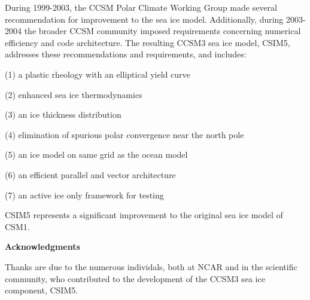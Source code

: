 \vfill
\eject
{}

During 1999-2003, the CCSM Polar Climate Working Group made several
recommendation for improvement to the sea ice model. Additionally,
during 2003-2004 the broader CCSM community imposed requirements 
concerning numerical efficiency and code architecture. The resulting 
CCSM3 sea ice model, CSIM5, addresses these recommendations and
requirements, and includes:

\parskip 10pt
\parindent 15pt

(1) a plastic rheology with an elliptical yield curve

(2) enhanced sea ice thermodynamics 

(3) an ice thickness distribution

(4) elimination of spurious polar convergence near the north pole

(5) an ice model on same grid as the ocean model

(6) an efficient parallel and vector architecture

(7) an active ice only framework for testing 

\parindent 0pt

CSIM5 represents a significant improvement to the original 
sea ice model of CSM1.

\vskip 15pt
\noindent
{\bf Acknowledgments}

Thanks are due to the numerous individals, both at NCAR and in the
scientific community, who contributed to the development of the
CCSM3 sea ice component, CSIM5.

\vfill
\eject
\vskip 15pt
\noindent

